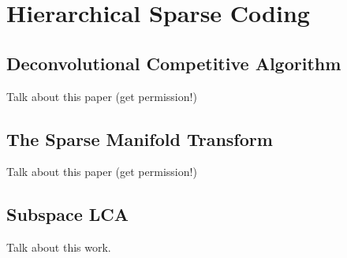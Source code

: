 \chapter{Hierarchical Sparse Coding}

\section{Deconvolutional Competitive Algorithm}
Talk about this paper (get permission!)

\section{The Sparse Manifold Transform}
Talk about this paper (get permission!)

\section{Subspace LCA}
Talk about this work.